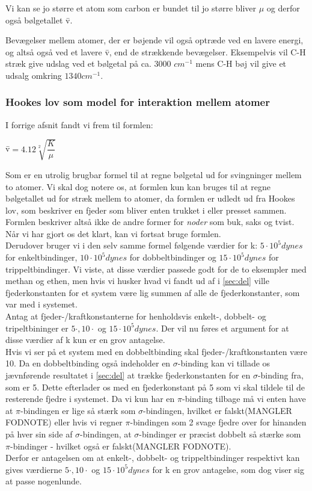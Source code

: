 Vi kan se jo større et atom som carbon er bundet til jo større bliver $\mu$ og derfor også bølgetallet \={v}.

Bevægelser mellem atomer, der er bøjende vil også optræde ved en lavere energi, og altså også ved et lavere \={v}, end de strækkende bevægelser. Eksempelvis vil C-H stræk give udslag ved et bølgetal på ca. 3000 $cm^{-1}$ mens C-H bøj vil give et udsalg omkring $1340cm^{-1}$.

\subsubsection{Hookes lov som model for interaktion mellem atomer}
I forrige afsnit fandt vi frem til formlen:

\begin{center}
\={v}$=4.12 \sqrt[2]{\dfrac{K}{\mu}}$
\end{center}

Som er en utrolig brugbar formel til at regne bølgetal ud for svingninger mellem to atomer. Vi skal dog notere os, at formlen kun kan bruges til at regne bølgetallet ud for stræk mellem to atomer, da formlen er udledt ud fra Hookes lov, som beskriver en fjeder som bliver enten trukket i eller presset sammen. Formlen beskriver altså ikke de andre former for \emph{noder} som buk, saks og tvist. Når vi har gjort os det klart, kan vi fortsat bruge formlen.
\\

Derudover bruger vi i den selv samme formel følgende værdier for k: $5 \cdot 10^5 dynes$ for enkeltbindinger, $10 \cdot 10^5 dynes$ for dobbeltbindinger og $15 \cdot 10^5 dynes$ for trippeltbindinger. Vi viste, at disse værdier passede godt for de to eksempler med methan og ethen, men hvis vi husker hvad vi fandt ud af i \ref{sec:del} ville fjederkonstanten for et system være lig summen af alle de fjederkonstanter, som var med i systemet.
\\

Antag at fjeder-/kraftkonstanterne for henholdsvis enkelt-, dobbelt- og tripeltbininger er $5 \cdot, 10 \cdot$ og $15 \cdot 10^5 dynes$. Der vil nu føres et argument for at disse værdier af k kun er en grov antagelse. 
\\

Hvis vi ser på et system med en dobbeltbinding skal fjeder-/kraftkonstanten være 10. Da en dobbeltbinding også indeholder en $\sigma$-binding kan vi tillade os jævnførende resultatet i \ref{sec:del} at trække fjederkonstanten for en $\sigma$-binding fra, som er 5. Dette efterlader os med en fjederkonstant på 5 som vi skal tildele til de resterende fjedre i systemet. Da vi kun har en $\pi$-binding tilbage må vi enten have at $\pi$-bindingen er lige så stærk som $\sigma$-bindingen, hvilket er falskt(MANGLER FODNOTE) eller hvis vi regner $\pi$-bindingen som 2 svage fjedre over for hinanden på hver sin side af $\sigma$-bindingen, at $\sigma$-bindinger er præcist dobbelt så stærke som $\pi$-bindinger - hvilket også er falskt(MANGLER FODNOTE).
\\

Derfor er antagelsen om at enkelt-, dobbelt- og trippeltbindinger respektivt kan gives værdierne $5 \cdot, 10 \cdot$ og $15 \cdot 10^5 dynes$ for k en grov antagelse, som dog viser sig at passe nogenlunde.